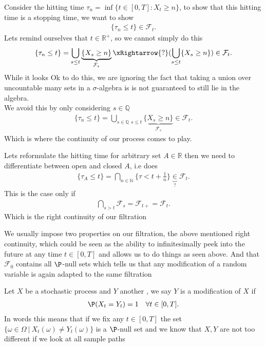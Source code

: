   \begin{example}
  Consider the hitting time $\tau_n = \inf \{t \in  [0,T] : X_t \ge n\}  $, to show that this hitting time is a stopping time, we want to show 
  \begin{align*}
    \{\tau_n \le  t\}   \in  \mathcal{F}_t
  .\end{align*}
  Lets remind ourselves that $t \in  \mathbb{R}^{+} $, so we cannot simply do this 
  \begin{align*}
    \{\tau_n \le  t\} = \bigcup_{s \le  t} \underbrace{\{X_s \ge n \}}_{\mathcal{F}_s} \xRightarrow{?} (\bigcup_{s \le  t} \{X_s \ge n \})   \in \mathcal{F}_t
  .\end{align*}
  While it looks Ok to do this, we are  ignoring the fact that taking a union over uncountable many sets in a $\sigma$-algebra is is not guaranteed to still lie in the algebra.\\[1ex]
  We avoid this by only considering $s \in  \mathbb{Q}$
  \begin{align*}
  \{\tau_n \le  t\} = \bigcup_{s \in  \mathbb{Q} \, \ s \le  t} \underbrace{\{X_s \ge n \}}_{\mathcal{F}_s} \in  \mathcal{F}_t 
  .\end{align*}  
  Which is where the continuity of our process comes to play.
  \end{example}
  \begin{remark}
    Lets reformulate the hitting time for arbitrary set $A \in  \mathbb{R}$  then we need to differentiate between 
    open and closed $A$, i.e does 
    \begin{align*}
      \{\tau_A \le  t\} = \bigcap_{n \in  \mathbb{N}} \{\tau < t + \frac{1}{n}\}  \underbrace{\in }_{?} \mathcal{F}_{t} 
    .\end{align*}
    This is the case only if 
    \begin{align*}
      \bigcap_{s > t} \mathcal{F}_s = \mathcal{F}_{t+} = \mathcal{F}_t
    .\end{align*}
    Which is the right continuity of our filtration
  \end{remark}
  We usually impose two properties on our filtration, the above mentioned right continuity, which could be seen as the ability to infinitesimally peek into the future at any time $t \in  [0,T]$ and allows us
  to do things as seen above. And that $\mathcal{F}_0$ contains all $\P$-null sets which tells us that any modification of a random variable is again adapted to the same filtration
  \begin{definition}[Modification]
    Let $X$ be a stochastic process and $Y$ another , we say $Y$ is a modification of $X$ if  
    \begin{align*}
      \P(X_t=Y_t) = 1 \quad \forall  t \in  [0,T]
    .\end{align*}
    In words this means that if we fix any $t \in [0,T]$ the set $\{\omega  \in  \Omega \ | \ X_t(\omega ) \neq  Y_t(\omega ) \}  $ is a $\P$-null set and we know 
    that $X,Y$ are not too different if we look at all sample paths
  \end{definition}
